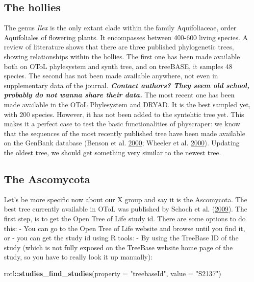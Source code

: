 \documentclass[]{article}
\newenvironment{Shaded}{\begin{snugshade}}{\end{snugshade}}
\newcommand{\DataTypeTok}[1]{\textcolor[rgb]{0.13,0.29,0.53}{#1}}
\newcommand{\KeywordTok}[1]{\textcolor[rgb]{0.13,0.29,0.53}{\textbf{#1}}}
\newcommand{\NormalTok}[1]{#1}
\newcommand{\OperatorTok}[1]{\textcolor[rgb]{0.81,0.36,0.00}{\textbf{#1}}}
\newcommand{\StringTok}[1]{\textcolor[rgb]{0.31,0.60,0.02}{#1}}
\begin{document}
\hypertarget{the-hollies}{%
\subsection{The hollies}\label{the-hollies}}

The genus \emph{Ilex} is the only extant clade within the family Aquifoliaceae, order Aquifoliales of flowering plants.
It encompasses between 400-600 living species. A review of litterature shows that there are three published phylogenetic trees, showing relationships within the hollies.
The first one has been made available both on OToL phylesystem and synth tree, and on treeBASE, it samples 48 species.
The second has not been made available anywhere, not even in supplementary data of the journal.
\textbf{\emph{Contact authors? They seem old school, probably do not wanna share their data.}}
The most recent one has been made available in the OToL Phylesystem and DRYAD. It is the best sampled yet, with 200 species. However,
it has not been added to the syntehtic tree yet.
This makes it a perfect case to test the basic functionalities of physcraper: we know that the sequences of the most recently published tree have been made available on the GenBank database (Benson et al. \protect\hyperlink{ref-benson2000genbank}{2000}; Wheeler et al. \protect\hyperlink{ref-wheeler2000database}{2000}). Updating the oldest tree, we should get something very similar to the newest tree.

\hypertarget{the-ascomycota}{%
\subsection{The Ascomycota}\label{the-ascomycota}}

Let's be more specific now about our X group and say it is the Ascomycota.
The best tree currently available in OToL was published by Schoch et al. (\protect\hyperlink{ref-schoch2009ascomycota}{2009}).
The first step, is to get the Open Tree of Life study id. There are some options to do this:
- You can go to the Open Tree of Life website and browse until you find it, or
- you can get the study id using R tools:
- By using the TreeBase ID of the study (which is not fully exposed on the
TreeBase website home page of the study, so you have to really look it up manually):

\begin{Shaded}
\begin{Highlighting}[]
\NormalTok{rotl}\OperatorTok{::}\KeywordTok{studies_find_studies}\NormalTok{(}\DataTypeTok{property =} \StringTok{"treebaseId"}\NormalTok{, }\DataTypeTok{value =} \StringTok{"S2137"}\NormalTok{)}
\end{Highlighting}
\end{Shaded}
\end{document}
